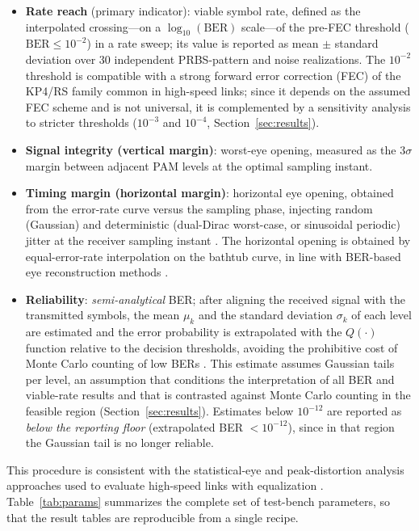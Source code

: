 \documentclass[preprint,review,12pt]{elsarticle}
\begin{document}
\begin{itemize}
\item \textbf{Rate reach} (primary indicator): viable symbol rate, defined
as the interpolated crossing---on a $\log_{10}(\mathrm{BER})$
scale---of the pre-FEC threshold ($\mathrm{BER}\le 10^{-2}$) in a rate
sweep; its value is reported as mean $\pm$ standard deviation over 30
independent PRBS-pattern and noise realizations. The $10^{-2}$ threshold
is compatible with a strong forward error correction (FEC) of the KP4/RS
family common in high-speed links; since it depends on the assumed FEC
scheme and is not universal, it is complemented by a sensitivity analysis
to stricter thresholds ($10^{-3}$ and $10^{-4}$,
Section~\ref{sec:results}).
\item \textbf{Signal integrity (vertical margin)}: worst-eye opening,
measured as the $3\sigma$ margin between adjacent PAM levels at the
optimal sampling instant.
\item \textbf{Timing margin (horizontal margin)}: horizontal eye opening,
obtained from the error-rate curve versus the sampling phase, injecting
random (Gaussian) and deterministic (dual-Dirac worst-case, or sinusoidal
periodic) jitter at the receiver sampling instant \citep{805809,9874925}.
The horizontal opening is obtained by equal-error-rate interpolation on
the bathtub curve, in line with BER-based eye reconstruction methods
\citep{Chen2024BER}.
\item \textbf{Reliability}: \emph{semi-analytical} BER; after aligning the
received signal with the transmitted symbols, the mean $\mu_k$ and the
standard deviation $\sigma_k$ of each level are estimated and the error
probability is extrapolated with the $Q(\cdot)$ function relative to the
decision thresholds, avoiding the prohibitive cost of Monte Carlo counting
of low BERs \citep{6248821,7202856,10415105}. This estimate assumes
Gaussian tails per level, an assumption that conditions the interpretation
of all BER and viable-rate results and that is contrasted against Monte
Carlo counting in the feasible region (Section~\ref{sec:results}).
Estimates below $10^{-12}$ are reported as \emph{below the reporting floor}
(extrapolated BER $<10^{-12}$), since in that region the Gaussian tail is
no longer reliable.
\end{itemize}

This procedure is consistent with the statistical-eye and peak-distortion
analysis approaches used to evaluate high-speed links with equalization
\citep{10705630}. Table~\ref{tab:params} summarizes the complete set of
test-bench parameters, so that the result tables are reproducible from a
single recipe.
\end{document}
